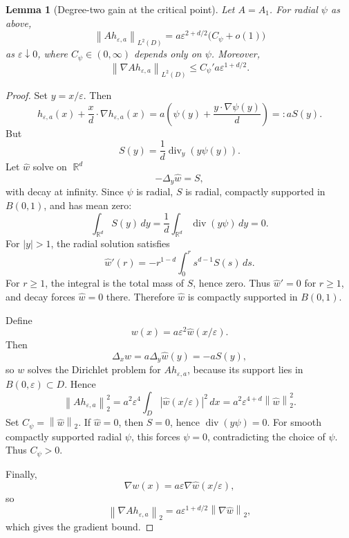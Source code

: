 \documentclass[12pt]{article}
\newtheorem{lemma}[theorem]{Lemma}
\theoremstyle{remark}
\DeclareMathOperator{\R}{\mathbb R}
\DeclareMathOperator{\divg}{div}
\newcommand{\norm}[1]{\left\lVert #1\right\rVert}
\begin{document}
\begin{lemma}[Degree-two gain at the critical point]
\label{lem:critical-gain}
Let \(A=A_1\). For radial \(\psi\) as above,
\[
\norm{A h_{\varepsilon,a}}_{L^2(D)}
=
a\varepsilon^{2+d/2}\bigl(C_\psi+o(1)\bigr)
\]
as \(\varepsilon\downarrow0\), where \(C_\psi\in(0,\infty)\) depends only on \(\psi\). Moreover,
\[
\norm{\nabla A h_{\varepsilon,a}}_{L^2(D)}
\le
C_\psi' a\varepsilon^{1+d/2}.
\]
\end{lemma}
\begin{proof}
Set \(y=x/\varepsilon\). Then
\[
h_{\varepsilon,a}(x)+\frac{x}{d}\cdot\nabla h_{\varepsilon,a}(x)
=
a\left(
\psi(y)+\frac{y\cdot\nabla\psi(y)}{d}
\right)
=:aS(y).
\]
But
\[
S(y)=\frac1d\divg_y(y\psi(y)).
\]
Let \(\widehat w\) solve on \(\R^d\)
\[
-\Delta_y\widehat w=S,
\]
with decay at infinity. Since \(\psi\) is radial, \(S\) is radial, compactly supported in \(B(0,1)\), and has mean zero:
\[
\int_{\R^d}S(y)\,dy
=
\frac1d\int_{\R^d}\divg(y\psi)\,dy
=
0.
\]
For \(|y|>1\), the radial solution satisfies
\[
\widehat w'(r)
=
-r^{1-d}\int_0^r s^{d-1}S(s)\,ds.
\]
For \(r\ge1\), the integral is the total mass of \(S\), hence zero. Thus \(\widehat w'=0\) for \(r\ge1\), and decay forces \(\widehat w=0\) there. Therefore \(\widehat w\) is compactly supported in \(B(0,1)\).

Define
\[
w(x)=a\varepsilon^2\widehat w(x/\varepsilon).
\]
Then
\[
\Delta_x w
=
a\Delta_y\widehat w(y)
=
-aS(y),
\]
so \(w\) solves the Dirichlet problem for \(Ah_{\varepsilon,a}\), because its support lies in \(B(0,\varepsilon)\subset D\). Hence
\[
\norm{Ah_{\varepsilon,a}}_2^2
=
a^2\varepsilon^4
\int_D|\widehat w(x/\varepsilon)|^2\,dx
=
a^2\varepsilon^{4+d}\norm{\widehat w}_2^2.
\]
Set \(C_\psi=\norm{\widehat w}_2\). If \(\widehat w=0\), then \(S=0\), hence \(\divg(y\psi)=0\). For smooth compactly supported radial \(\psi\), this forces \(\psi=0\), contradicting the choice of \(\psi\). Thus \(C_\psi>0\).

Finally,
\[
\nabla w(x)=a\varepsilon\nabla\widehat w(x/\varepsilon),
\]
so
\[
\norm{\nabla Ah_{\varepsilon,a}}_2
=
a\varepsilon^{1+d/2}\norm{\nabla\widehat w}_2,
\]
which gives the gradient bound.
\end{proof}
\end{document}
